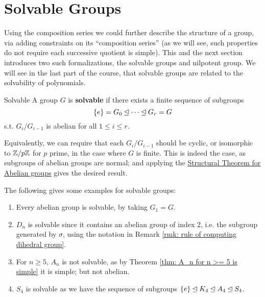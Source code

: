 \section{Solvable Groups}

\textstart
Using the composition series we could further describe the structure of a group, via adding constraints on its ``composition series'' (as we will see, such properties do not require each successive quotient is simple). This and the next section introduces two such formalizations, the solvable groups and nilpotent group. We will see in the last part of the course, that solvable groups are related to the solvability of polynomials. 

\begin{definition}{Solvable}
    A group $G$ is \textbf{solvable} if there exists a finite sequence of subgroups
    \[
        \{e\} = G_0 \unlhd \cdots \unlhd G_r = G
    \]
    s.t. $G_i/G_{i-1}$ is abelian for all $1 \leq i \leq r$.
\end{definition}

\begin{remark}
    Equivalently, we can require that each $G_i/G_{i-1}$ should be cyclic, or isomorphic to $\mathbb{Z}/p\mathbb{Z}$ for $p$ prime, in the case where $G$ is finite. This is indeed the case, as subgroups of abelian groups are normal; and applying the \hyperref[thm: structural theorem]{Structural Theorem for Abelian groups} gives the desired result.
\end{remark}

\begin{example}
    The following gives some examples for solvable groups:
    \begin{enumerate}[label=\arabic*)]
        \item Every abelian group is solvable, by taking $G_1 = G$.
        \item $D_n$ is solvable since it contains an abelian group of index 2, i.e. the subgroup generated by $\sigma$, using the notation in Remark \ref{rmk: rule of computing dihedral group}.
        \item For $n \geq 5$, $A_n$ is not solvable, as by Theorem \ref{thm: A_n for n >= 5 is simple} it is simple; but not abelian.
        \item $S_4$ is solvable as we have the sequence of subgroups $\{e\} \unlhd K_4 \unlhd A_4 \unlhd S_4$.
    \end{enumerate}
\end{example}

